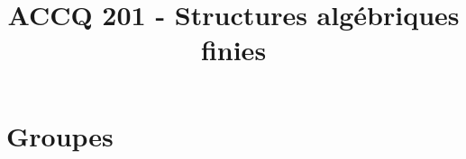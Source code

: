 \documentclass[a4paper,9pt]{article}
\title{\vspace{-1.2cm} ACCQ 201 - Structures algébriques finies}
\begin{document}
\maketitle

\vspace{-1.5cm}

\section{Groupes}

	
\end{document}
